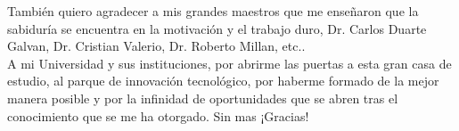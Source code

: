 
\begin{acknowledgements}

También quiero agradecer a mis grandes maestros que me enseñaron que la sabiduría se encuentra en la motivación y el trabajo duro, Dr. Carlos Duarte Galvan, Dr. Cristian Valerio, Dr. Roberto Millan, etc..\\
A mi Universidad y sus instituciones, por abrirme las puertas a esta gran casa de estudio, al parque de innovación tecnológico, por haberme formado de la mejor manera posible y por la infinidad de oportunidades que se abren tras el conocimiento que se me ha otorgado. Sin mas ¡Gracias!
\end{acknowledgements}




